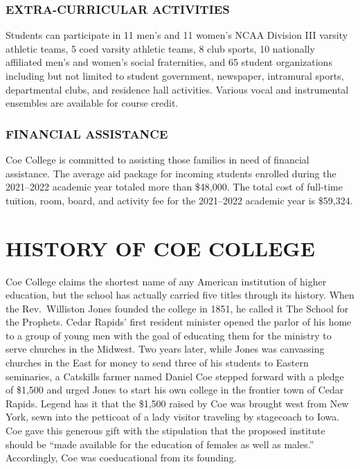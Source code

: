 \documentclass[
  letterpaper,
]{scrbook}
\begin{document}
\hypertarget{extra-curricular-activities}{%
\subsection*{EXTRA-CURRICULAR
ACTIVITIES}\label{extra-curricular-activities}}

Students can participate in 11 men's and 11 women's NCAA Division III
varsity athletic teams, 5 coed varsity athletic teams, 8 club sports, 10
nationally affiliated men's and women's social fraternities, and 65
student organizations including but not limited to student government,
newspaper, intramural sports, departmental clubs, and residence hall
activities. Various vocal and instrumental ensembles are available for
course credit.

\hypertarget{financial-assistance}{%
\subsection*{FINANCIAL ASSISTANCE}\label{financial-assistance}}

Coe College is committed to assisting those families in need of
financial assistance. The average aid package for incoming students
enrolled during the 2021--2022 academic year totaled more than \$48,000.
The total cost of full-time tuition, room, board, and activity fee for
the 2021--2022 academic year is \$59,324.


\hypertarget{history-of-coe-college}{%
\chapter*{HISTORY OF COE COLLEGE}\label{history-of-coe-college}}


Coe College claims the shortest name of any American institution of
higher education, but the school has actually carried five titles
through its history. When the Rev.~Williston Jones founded the college
in 1851, he called it The School for the Prophets. Cedar Rapids' first
resident minister opened the parlor of his home to a group of young men
with the goal of educating them for the ministry to serve churches in
the Midwest. Two years later, while Jones was canvassing churches in the
East for money to send three of his students to Eastern seminaries, a
Catskills farmer named Daniel Coe stepped forward with a pledge of
\$1,500 and urged Jones to start his own college in the frontier town of
Cedar Rapids. Legend has it that the \$1,500 raised by Coe was brought
west from New York, sewn into the petticoat of a lady visitor traveling
by stagecoach to Iowa. Coe gave this generous gift with the stipulation
that the proposed institute should be ``made available for the education
of females as well as males.'' Accordingly, Coe was coeducational from
its founding.
\end{document}
